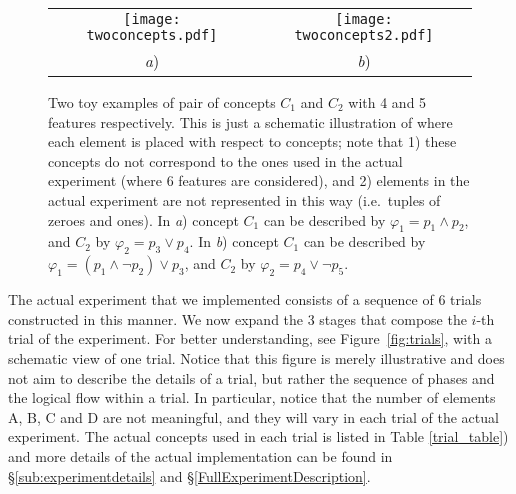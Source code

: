 \begin{figure}
\begin{center}
\begin{tabular}{cc}
	\texttt{[image: twoconcepts.pdf]}&
	\texttt{[image: twoconcepts2.pdf]}
	\\
	{\em a})&{\em b})
\end{tabular}
\end{center}\caption{\color{blue}Two toy examples of pair of concepts $C_1$ and $C_2$ with 4 and 5 features respectively. This is just a schematic illustration of where each element is placed with respect to concepts; note that 1) these concepts do not correspond to the ones used in the actual experiment (where 6 features are considered), and 2) elements in the actual experiment are not represented in this way (i.e.\ tuples of zeroes and ones). In {\em a}) concept $C_1$ can be described by $\varphi_1=p_1\land p_2$, and $C_2$ by $\varphi_2=p_3\lor p_4$. In {\em b}) concept $C_1$ can be described by $\varphi_1=(p_1 \land \lnot p_2) \lor p_3$, and $C_2$ by $\varphi_2=p_4\lor \lnot p_5$.
\color{black}}
\label{fig:twoconcepts}
\end{figure}

The actual experiment that we implemented consists of a sequence of 6 trials constructed in this manner. 
We now expand the 3 stages that compose the $i$-th trial of the experiment. \color{blue} For better understanding, see Figure~\ref{fig:trials}, with a schematic view of one trial. Notice that this figure is merely illustrative and does not aim to describe the details of a trial, but rather the sequence of phases and the logical flow within a trial. In particular, notice that the number of elements {\sf A}, {\sf B}, {\sf C} and {\sf D} are not meaningful, and they will vary in each trial of the actual experiment.\color{black} The actual concepts used in each trial is listed in Table \ref{trial_table}) and
more details of the actual implementation can be found in \S\ref{sub:experimentdetails} %
 and \S\ref{FullExperimentDescription}.
 \color{black}
 
